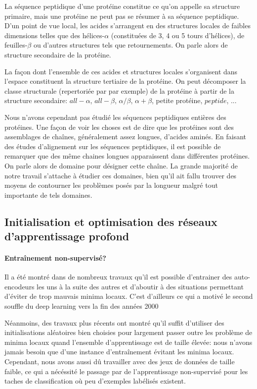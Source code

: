 \documentclass[a4paper, 11pt, onecolumn]{article}
\begin{document}
La séquence peptidique d'une protéine constitue ce qu'on appelle sa structure
primaire, mais une protéine ne peut pas se résumer à sa séquence peptidique.
D'un point de vue local, les acides s'arrangent en des structures locales de
faibles dimensions telles que des hélices-$\alpha$ (constituées de 3, 4 ou 5 tours
d'hélices), de feuilles-$\beta$ ou d'autres structures tels que retournements.
On parle alors de structure secondaire de la protéine.

La façon dont l'ensemble de ces acides et structures locales s'organisent dans
l'espace constituent la structure tertiaire de la protéine. On peut décomposer la
classe structurale (repertoriée par \cite{fox2014scope} par exemple) de la protéine à partir de la structure secondaire:
$all-\alpha$, $all-\beta$, $\alpha /\beta$, $\alpha + \beta$, petite protéine,
$peptide$, ...

Nous n'avons cependant pas étudié les séquences peptidiques entières des
protéines. Une façon de voir les choses est de dire que les protéines sont des
assemblages de chaînes, généralement assez longues, d'acides aminés. En faisant
des études d'alignement sur les séquences peptidiques, il est possible de
remarquer que des même chaines longues apparaissent dans différentes protéines.
On parle alors de domaine pour désigner cette chaîne.
 La grande majorité de notre travail s'attache à
étudier ces domaines, bien qu'il ait fallu trouver des moyens de contourner les
problèmes posés par la longueur malgré tout importante de tels domaines. 

\subsection{Initialisation et optimisation des réseaux d'apprentissage profond}

\paragraph{Entraînement non-supervisé?}

Il a été montré dans de nombreux travaux qu'il est possible d'entrainer des
auto-encodeurs les uns à la suite des autres et d'aboutir à des situations permettant
d'éviter de trop mauvais minima locaux. C'est d'ailleurs ce qui a motivé le
second souffle du deep learning vers la fin des années 2000

Néanmoins, des travaux plus récents ont montré qu'il suffit d'utiliser des
initialisations aléatoires bien choisies pour largement passer outre les problème
de minima locaux quand l'ensemble d'apprentissage est de taille élevée: nous n'avons jamais besoin que d'une instance d'entraînement
évitant les minima locaux. Cependant, nous avons aussi dû travailler avec des jeux de
données de taille faible, ce qui a nécéssité le passage par de l'apprentissage
non-supervisé pour les taches de classification où peu d'exemples labélisés existent.
\end{document}

